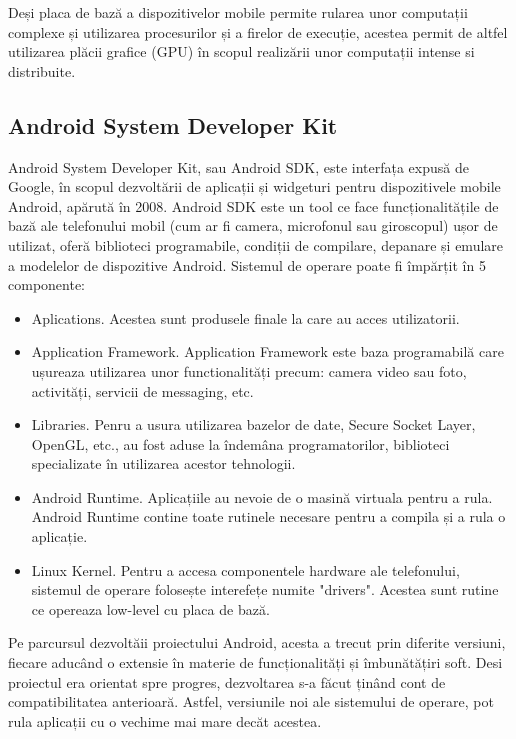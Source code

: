 	Deși placa de bază a dispozitivelor mobile permite rularea unor computații complexe și utilizarea procesurilor și a firelor de execuție, acestea permit de altfel utilizarea plăcii grafice (GPU) în scopul realizării unor computații intense si distribuite.
	
	\subsection{Android System Developer Kit}
	
	Android System Developer Kit, sau Android SDK, este interfața expusă de Google, în scopul dezvoltării de aplicații și widgeturi pentru dispozitivele mobile Android, apărută în 2008. Android SDK este un tool ce face  funcționalitățile de bază ale telefonului mobil (cum ar fi camera, microfonul sau giroscopul) ușor de utilizat, oferă biblioteci programabile, condiții de compilare, depanare și emulare a modelelor de dispozitive Android. 
	Sistemul de operare poate fi împărțit în 5 componente:
	\begin{itemize}
		\item Aplications. Acestea sunt produsele finale la care au acces utilizatorii.
		
		
		\item Application Framework. Application Framework este baza programabilă care ușureaza utilizarea unor functionalități precum: camera video sau foto, activități, servicii de messaging, etc.
		
		\item Libraries. Penru a usura utilizarea bazelor de date, Secure Socket Layer, OpenGL, etc., au fost aduse la îndemâna programatorilor, biblioteci specializate în utilizarea acestor tehnologii.
		
		\item Android Runtime. Aplicațiile au nevoie de o masină virtuala pentru a rula. Android Runtime contine toate rutinele necesare pentru a compila și a rula o aplicație.
		
		\item Linux Kernel. Pentru a accesa componentele hardware ale telefonului, sistemul de operare folosește interefețe numite "drivers". Acestea sunt rutine ce opereaza low-level cu placa de bază.
	\end{itemize}
	
	\vfill
	
	Pe parcursul dezvoltăii proiectului Android, acesta a trecut prin diferite versiuni, fiecare aducând o extensie în materie de funcționalități și îmbunătățiri soft. Desi proiectul era orientat spre progres, dezvoltarea s-a făcut ținând cont de compatibilitatea anterioară. Astfel, versiunile noi ale sistemului de operare, pot rula aplicații cu o vechime mai mare decăt acestea.
	
